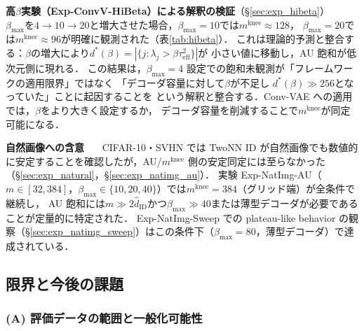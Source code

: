 \documentclass[11pt,a4paper]{jsarticle}
\newcommand{\mknee}{m^{\mathrm{knee}}}
\begin{document}
\textbf{高$\beta$実験（Exp-ConvV-HiBeta）による解釈の検証}（§\ref{sec:exp_hibeta}）~~~
$\beta_{\max}$を$4\to10\to20$と増大させた場合，$\beta_{\max}=10$では$\mknee \approx 128$，
$\beta_{\max}=20$では$\mknee \approx 96$が明確に観測された（表\ref{tab:hibeta}）．
これは理論的予測と整合する：$\beta$の増大により$d^*(\beta) = |\{j: \lambda_j > \beta\tau^2_\mathrm{eff}\}|$が
小さい値に移動し，AU 飽和が低次元側に現れる．
この結果は，$\beta_{\max}=4$ 設定での飽和未観測が「フレームワークの適用限界」ではなく
「デコーダ容量に対して$\beta$が不足し $d^*(\beta) \gg 256$となっていた」ことに起因することを
という解釈と整合する．Conv-VAE への適用では，$\beta$をより大きく設定するか，
デコーダ容量を削減することで$\mknee$が同定可能になる．


\textbf{自然画像への含意}~~~
CIFAR-10・SVHN では TwoNN ID が自然画像でも数値的に安定することを確認したが，AU/$\mknee$ 側の安定同定には至らなかった（§\ref{sec:exp_natural}，§\ref{sec:exp_natimg_au}）．
実験 Exp-NatImg-AU（$m \in [32, 384]$，$\beta_{\max} \in \{10,20,40\}$）では$\mknee = 384$（グリッド端）が全条件で継続し，
AU 飽和には$m \gg 2\hat{d}_\mathrm{ID}$かつ$\beta_{\max} \gg 40$または薄型デコーダが必要であることが定量的に特定された．
Exp-NatImg-Sweep での plateau-like behavior の観察（§\ref{sec:exp_natimg_sweep}）はこの条件下（$\beta_{\max}=80$，薄型デコーダ）で達成されている．

\subsection{限界と今後の課題}\label{sec:disc_limitation}

\subsubsection*{(A) 評価データの範囲と一般化可能性}
\end{document}
